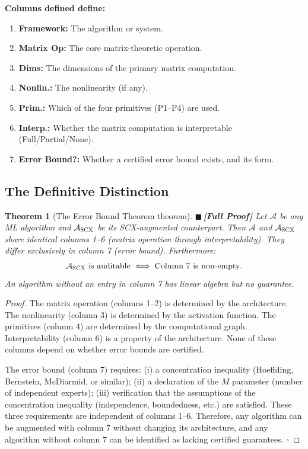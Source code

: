 \documentclass[12pt,a4paper]{article}
\newtheorem{theorem}{Theorem}[section]
\theoremstyle{definition}
\newcommand{\rigorFull}{{\color{rigorcolor}$\blacksquare$\,\textbf{[Full Proof]}}}
\newcommand{\SCX}{\textsc{SCX}}
\newcommand{\cA}{\mathcal{A}}
\begin{document}
\textbf{Columns defined define:}
\begin{enumerate}[label=(\arabic*), nosep]
    \item \textbf{Framework:} The algorithm or system.
    \item \textbf{Matrix Op:} The core matrix-theoretic operation.
    \item \textbf{Dims:} The dimensions of the primary matrix computation.
    \item \textbf{Nonlin.:} The nonlinearity (if any).
    \item \textbf{Prim.:} Which of the four primitives (P1--P4) are used.
    \item \textbf{Interp.:} Whether the matrix computation is interpretable (Full/Partial/None).
    \item \textbf{Error Bound?:} Whether a certified error bound exists, and its form.
\end{enumerate}

\subsection{The Definitive Distinction }

\begin{theorem}[The Error Bound Theorem theorem]\label{thm:error_bound}
\rigorFull
Let $\cA$ be any ML algorithm and $\cA_{\SCX}$ be its \SCX{}-augmented counterpart.
Then $\cA$ and $\cA_{\SCX}$ share identical columns 1--6 (matrix operation through 
interpretability). They differ exclusively in column 7 (error bound). Furthermore:
\begin{equation}\label{eq:definitive_diff}
    \cA_{\SCX} \text{ is auditable} \iff \text{Column 7 is non-empty}.
\end{equation}
An algorithm without an entry in column 7 has linear algebra but no guarantee.
\end{theorem}

\begin{proof}
The matrix operation (columns 1--2) is determined by the architecture. The nonlinearity 
(column 3) is determined by the activation function. The primitives (column 4) are 
determined by the computational graph. Interpretability (column 6) is a property of 
the architecture. None of these columns depend on whether error bounds are certified.

The error bound (column 7) requires: (i) a concentration inequality (Hoeffding, 
Bernstein, McDiarmid, or similar); (ii) a declaration of the $M$ parameter (number 
of independent experts); (iii) verification that the assumptions of the concentration 
inequality (independence, boundedness, etc.) are satisfied. These three requirements 
are independent of columns 1--6. Therefore, any algorithm can be augmented with 
column 7 without changing its architecture, and any algorithm without column 7 can 
be identified as lacking certified guarantees. \hfill $\square$
\end{proof}
\end{document}
